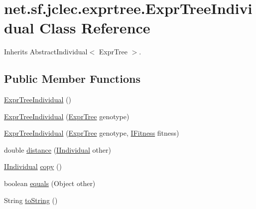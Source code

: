 \hypertarget{classnet_1_1sf_1_1jclec_1_1exprtree_1_1_expr_tree_individual}{\section{net.\-sf.\-jclec.\-exprtree.\-Expr\-Tree\-Individual Class Reference}
\label{classnet_1_1sf_1_1jclec_1_1exprtree_1_1_expr_tree_individual}
}


Inherits Abstract\-Individual$<$ Expr\-Tree $>$.

\subsection*{Public Member Functions}
\begin{DoxyCompactItemize}
\item 
\hyperlink{classnet_1_1sf_1_1jclec_1_1exprtree_1_1_expr_tree_individual_a90f6adb50d1bb1006f2f7b570a63a30b}{Expr\-Tree\-Individual} ()
\item 
\hyperlink{classnet_1_1sf_1_1jclec_1_1exprtree_1_1_expr_tree_individual_a677fd6fed93235286269875d8e0aaace}{Expr\-Tree\-Individual} (\hyperlink{classnet_1_1sf_1_1jclec_1_1exprtree_1_1_expr_tree}{Expr\-Tree} genotype)
\item 
\hyperlink{classnet_1_1sf_1_1jclec_1_1exprtree_1_1_expr_tree_individual_acaa907c4991ac92450ab58de3fb20fa8}{Expr\-Tree\-Individual} (\hyperlink{classnet_1_1sf_1_1jclec_1_1exprtree_1_1_expr_tree}{Expr\-Tree} genotype, \hyperlink{interfacenet_1_1sf_1_1jclec_1_1_i_fitness}{I\-Fitness} fitness)
\item 
double \hyperlink{classnet_1_1sf_1_1jclec_1_1exprtree_1_1_expr_tree_individual_ae0ad5d9b4da029b8d71f81ce83189d63}{distance} (\hyperlink{interfacenet_1_1sf_1_1jclec_1_1_i_individual}{I\-Individual} other)
\item 
\hyperlink{interfacenet_1_1sf_1_1jclec_1_1_i_individual}{I\-Individual} \hyperlink{classnet_1_1sf_1_1jclec_1_1exprtree_1_1_expr_tree_individual_aa58c74282bb238ce2f44cc6db1e6890a}{copy} ()
\item 
boolean \hyperlink{classnet_1_1sf_1_1jclec_1_1exprtree_1_1_expr_tree_individual_ac183d4db7b77f8000827755588551efc}{equals} (Object other)
\item 
String \hyperlink{classnet_1_1sf_1_1jclec_1_1exprtree_1_1_expr_tree_individual_a5cb900ef9079188e4f4e69eba1397701}{to\-String} ()
\end{DoxyCompactItemize}


